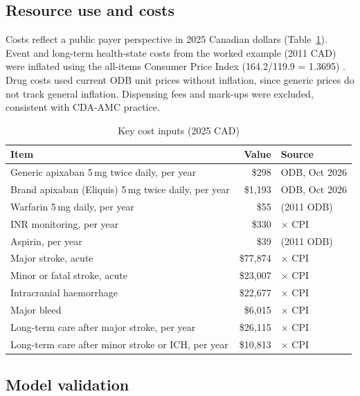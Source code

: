 \documentclass[11pt,letterpaper]{article}
\begin{document}
\subsection{Resource use and costs}

Costs reflect a public payer perspective in 2025 Canadian dollars (Table~\ref{tab:costs}). Event
and long-term health-state costs from the worked example (2011 CAD) were inflated using the
all-items Consumer Price Index (164.2/119.9 = 1.3695) \cite{statcancpi}. Drug costs used current
ODB unit prices without inflation, since generic prices do not track general inflation. Dispensing
fees and mark-ups were excluded, consistent with CDA-AMC practice.

\begin{table}[H]
\centering
\caption{Key cost inputs (2025 CAD)}
\label{tab:costs}
\small
\begin{tabular}{@{}lrl@{}}
\toprule
Item & Value & Source \\
\midrule
Generic apixaban 5\,mg twice daily, per year & \$298 & ODB, Oct 2026 \cite{odb} \\
Brand apixaban (Eliquis) 5\,mg twice daily, per year & \$1,193 & ODB, Oct 2026 \cite{odb} \\
Warfarin 5\,mg daily, per year & \$55 & \cite{cadthwe} (2011 ODB) \\
INR monitoring, per year & \$330 & \cite{cadthwe} $\times$ CPI \\
Aspirin, per year & \$39 & \cite{cadthwe} (2011 ODB) \\
Major stroke, acute & \$77,874 & \cite{cadthwe} $\times$ CPI \\
Minor or fatal stroke, acute & \$23,007 & \cite{cadthwe} $\times$ CPI \\
Intracranial haemorrhage & \$22,677 & \cite{cadthwe} $\times$ CPI \\
Major bleed & \$6,015 & \cite{cadthwe} $\times$ CPI \\
Long-term care after major stroke, per year & \$26,115 & \cite{cadthwe} $\times$ CPI \\
Long-term care after minor stroke or ICH, per year & \$10,813 & \cite{cadthwe} $\times$ CPI \\
\bottomrule
\end{tabular}
\end{table}

\subsection{Model validation}
\label{sec:methods-validation}
\end{document}
